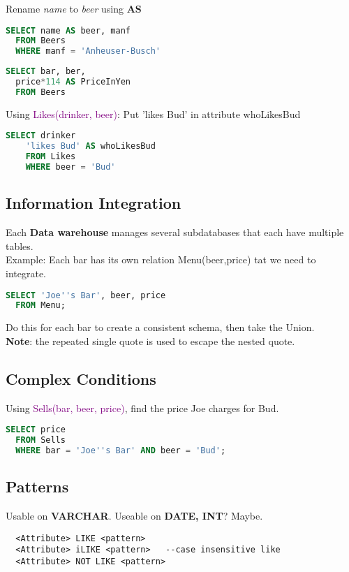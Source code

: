 \documentclass[12pt]{article}
\begin{document}
Rename \emph{name} to \emph{beer} using \textbf{AS}
\begin{lstlisting}[language=SQL]
  SELECT name AS beer, manf
  FROM Beers
  WHERE manf = 'Anheuser-Busch'
\end{lstlisting}

\begin{lstlisting}[language=SQL]
  SELECT bar, ber,
  price*114 AS PriceInYen
  FROM Beers
\end{lstlisting}

Using \textcolor{purple}{Likes(drinker, beer)}:
Put 'likes Bud' in attribute whoLikesBud
\begin{lstlisting}[language=SQL]
  SELECT drinker
    'likes Bud' AS whoLikesBud
    FROM Likes
    WHERE beer = 'Bud'
\end{lstlisting}

\subsection{Information Integration}
Each \textbf{Data warehouse} manages several subdatabases that each have multiple tables.\\

Example: Each bar has its own relation Menu(beer,price) tat we need to
integrate.
\begin{lstlisting}[language=SQL]
  SELECT 'Joe''s Bar', beer, price
  FROM Menu;
\end{lstlisting}
Do this for each bar to create a consistent schema, then take the Union.\\
\textbf{Note}: the repeated single quote is used to escape the nested quote.

\subsection{Complex Conditions}
Using \textcolor{purple}{Sells(bar, beer, price)}, find the price Joe charges
for Bud.  
\begin{lstlisting}[language=SQL]
  SELECT price
  FROM Sells
  WHERE bar = 'Joe''s Bar' AND beer = 'Bud';
\end{lstlisting}

\subsection{Patterns}
Usable on \textbf{VARCHAR}. Useable on \textbf{DATE, INT}? Maybe.
\begin{verbatim}
  <Attribute> LIKE <pattern>
  <Attribute> iLIKE <pattern>   --case insensitive like
  <Attribute> NOT LIKE <pattern>
\end{verbatim}
\end{document}
